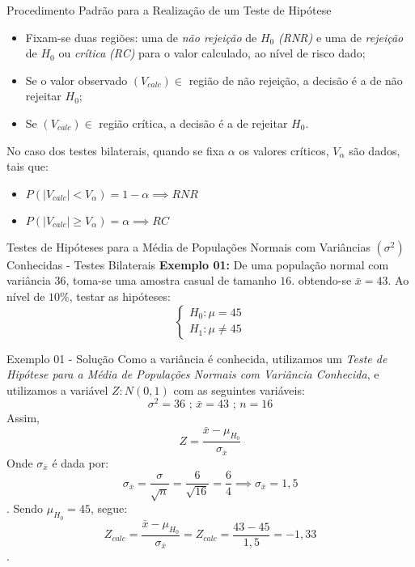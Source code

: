 \documentclass[hyperref={pdfpagelabels=false}]{beamer}
\begin{document}
\begin{frame}{Procedimento Padrão para a Realização de um Teste de Hipótese}
	\begin{itemize}
		\item Fixam-se duas regiões: uma de \emph{não rejeição} de $H_0$ \textit{(RNR)} e uma de \emph{rejeição} de $H_0$ ou \emph{crítica} \textit{(RC)} para o valor calculado, ao nível de risco dado; \pause
		\item Se o valor observado $(V_{calc}) \in$ região de não rejeição, a decisão é a de não rejeitar $H_0$; \pause
		\item Se $(V_{calc}) \in$ região crítica, a decisão é a de rejeitar $H_0$. \pause
	\end{itemize}

	No caso dos testes bilaterais, quando se fixa $\alpha$ os valores críticos, $V_\alpha$ são dados, tais que: \pause
	\begin{itemize}
		\item $P(|V_{calc}| < V_{\alpha}) = 1 - \alpha \implies RNR$
		\item $P(|V_{calc}| \geq V_{\alpha}) = \alpha \implies RC$
	\end{itemize}
\end{frame}

\begin{frame}{Testes de Hipóteses para a Média de Populações Normais com Variâncias $(\sigma^2)$ Conhecidas - Testes Bilaterais}
	\textbf{Exemplo 01:} De uma população normal com variância $36$, toma-se uma amostra casual de tamanho $16$. obtendo-se $\bar{x} = 43$. Ao nível de $10\%$, testar as hipóteses:
	$$\begin{cases}
	H_0: \mu = 45\\
	H_1: \mu \neq 45
	\end{cases}
	$$
	
\end{frame}

\begin{frame}{Exemplo 01 - Solução}
	Como a variância é conhecida, utilizamos um \emph{Teste de Hipótese para a Média de Populações Normais com Variância Conhecida}, e utilizamos a variável $Z:N(0,1)$ com as seguintes variáveis: \pause
	$$\sigma^2 = 36 \text{  ;   } \bar{x} = 43 \text{  ;   } n = 16$$ \pause
	Assim, \pause
	$$Z = \frac{\bar{x} - \mu_{H_0}}{\sigma_{\bar{x}}}$$ \pause
	Onde $\sigma_{\bar{x}}$ é dada por: \pause
	$$\sigma_{\bar{x}} = \frac{\sigma}{\sqrt{n}} = \frac{6}{\sqrt{16}} = \frac{6}{4} \implies \sigma_{\bar{x}} = 1,5$$. \pause
	Sendo $\mu_{H_0} = 45$, segue:
	$$Z_{calc} = \frac{\bar{x} - \mu_{H_0}}{\sigma_{\bar{x}}} = Z_{calc} = \frac{43 - 45}{1,5} = -1,33 $$.
	
\end{frame}
\end{document}
